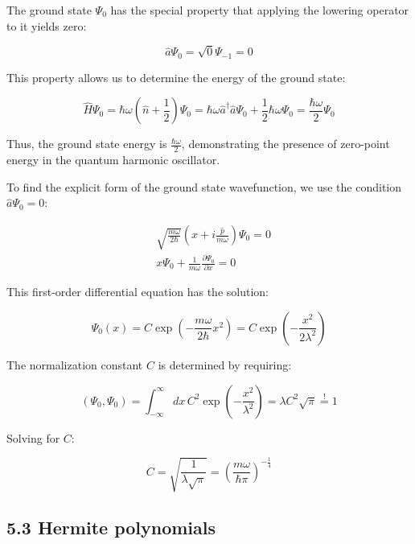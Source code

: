 \documentclass[10pt]{article}
\begin{document}
The ground state $\Psi_0$ has the special property that applying the lowering operator to it yields zero:

\begin{equation*}
\hat{a}\Psi_0 = \sqrt{0}\Psi_{-1} = 0 \tag{5.38}
\end{equation*}

This property allows us to determine the energy of the ground state:

\begin{equation*}
\hat{H}\Psi_0 = \hbar\omega\left(\hat{n}+\frac{1}{2}\right)\Psi_0 = \hbar\omega\hat{a}^\dagger\hat{a}\Psi_0 + \frac{1}{2}\hbar\omega\Psi_0 = \frac{\hbar\omega}{2}\Psi_0 \tag{5.39}
\end{equation*}

Thus, the ground state energy is $\frac{\hbar\omega}{2}$, demonstrating the presence of zero-point energy in the quantum harmonic oscillator.

To find the explicit form of the ground state wavefunction, we use the condition $\hat{a}\Psi_0 = 0$:

\begin{align*}
&\sqrt{\frac{m\omega}{2\hbar}}\left(x + i\frac{\hat{p}}{m\omega}\right)\Psi_0 = 0 \tag{5.40} \\
&x\Psi_0 + \frac{1}{m\omega}\frac{\partial\Psi_0}{\partial x} = 0
\end{align*}

This first-order differential equation has the solution:

\begin{equation*}
\Psi_0(x) = C\exp\left(-\frac{m\omega}{2\hbar}x^2\right) = C\exp\left(-\frac{x^2}{2\lambda^2}\right) \tag{5.41}
\end{equation*}

The normalization constant $C$ is determined by requiring:

\begin{equation*}
(\Psi_0, \Psi_0) = \int_{-\infty}^{\infty}dx\,C^2\exp\left(-\frac{x^2}{\lambda^2}\right) = \lambda C^2\sqrt{\pi} \stackrel{!}{=} 1 \tag{5.42}
\end{equation*}

Solving for $C$:

\begin{equation*}
C = \sqrt{\frac{1}{\lambda\sqrt{\pi}}} = \left(\frac{m\omega}{\hbar\pi}\right)^{-\frac{1}{4}} \tag{5.43}
\end{equation*}

\subsection*{5.3 Hermite polynomials}
\end{document}
